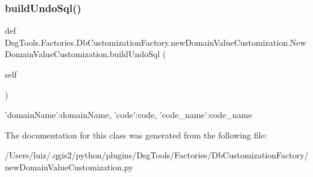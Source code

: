 \subsubsection{\texorpdfstring{build\+Undo\+Sql()}{buildUndoSql()}}
{\footnotesize\ttfamily def Dsg\+Tools.\+Factories.\+Db\+Customization\+Factory.\+new\+Domain\+Value\+Customization.\+New\+Domain\+Value\+Customization.\+build\+Undo\+Sql (\begin{DoxyParamCaption}\item[{}]{self }\end{DoxyParamCaption})}

\begin{DoxyVerb}{'domainName':domainName, 'code':code, 'code_name':code_name}
\end{DoxyVerb}
 

The documentation for this class was generated from the following file\+:\begin{DoxyCompactItemize}
\item 
/\+Users/luiz/.\+qgis2/python/plugins/\+Dsg\+Tools/\+Factories/\+Db\+Customization\+Factory/new\+Domain\+Value\+Customization.\+py\end{DoxyCompactItemize}
